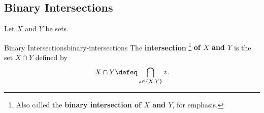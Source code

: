 \subsection{Binary Intersections}\label{subsection-binary-intersections}
Let $X$ and $Y$ be sets.%
\begin{definition}{Binary Intersections}{binary-intersections}%
    The \textbf{intersection}%
    \footnote{%
        Also called the \textbf{binary intersection of $X$ and $Y$}, for emphasis.
        \par\vspace*{-1.75\baselineskip}
    } %
    \textbf{of $X$ and $Y$} is the set $X\cap Y$ defined by
    \[
        X\cap Y
        \defeq
        \bigcap_{z\in\{X,Y\}}z.
    \]%
\end{definition}
